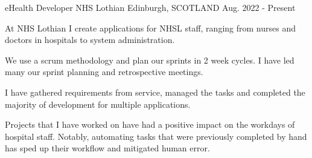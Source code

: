 \begin{cventries}
  \cventry
    {eHealth Developer} %
    {NHS Lothian} %
    {Edinburgh, SCOTLAND} %
    {Aug. 2022 - Present} %
    {
      \color{awesome}              \color{graytext}
      \vspace{1.6em}
      \begin{cvitems} %
        \item At NHS Lothian I create applications for NHSL staff, ranging from nurses and doctors in hospitals to system administration.
        \item We use a scrum methodology and plan our sprints in 2 week cycles. I have led many our sprint planning and retrospective meetings.
        \item I have gathered requirements from service, managed the tasks and completed the majority of development for multiple applications.
        \item Projects that I have worked on have had a positive impact on the workdays of hospital staff. Notably, automating tasks that were previously completed by hand has sped up their workflow and mitigated human error.
      \end{cvitems}
    }
\end{cventries}
